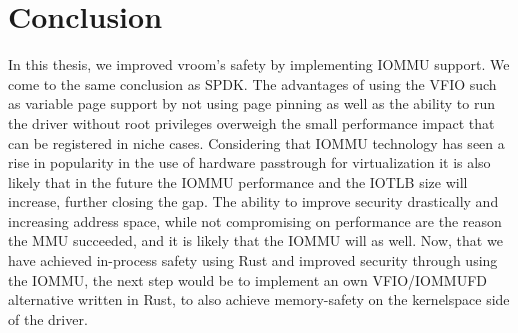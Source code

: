 \chapter{Conclusion}

In this thesis, we improved vroom's safety by implementing IOMMU support. We come to the same conclusion as SPDK. The advantages of using the VFIO such as variable page support by not using page pinning as well as the ability to run the driver without root privileges overweigh the small performance impact that can be registered in niche cases. Considering that IOMMU technology has seen a rise in popularity in the use of hardware passtrough for virtualization it is also likely that in the future the IOMMU performance and the IOTLB size will increase, further closing the gap. The ability to improve security drastically and increasing address space, while not compromising on performance are the reason the MMU succeeded, and it is likely that the IOMMU will as well. Now, that we have achieved in-process safety using Rust and improved security through using the IOMMU, the next step would be to implement an own VFIO/IOMMUFD alternative written in Rust, to also achieve memory-safety on the kernelspace side of the driver.